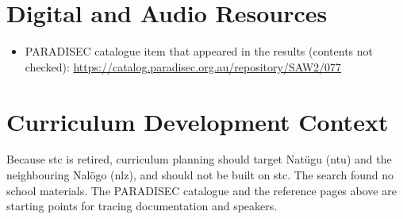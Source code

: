 \documentclass[12pt]{article}
\begin{document}
\section{Digital and Audio Resources}
\begin{itemize}
\item PARADISEC catalogue item that appeared in the results (contents not checked): \url{https://catalog.paradisec.org.au/repository/SAW2/077}
\end{itemize}

\section{Curriculum Development Context}
Because stc is retired, curriculum planning should target Natügu (ntu) and the neighbouring Nal\"ogo (nlz), and should not be built on stc. The search found no school materials. The PARADISEC catalogue and the reference pages above are starting points for tracing documentation and speakers.
\end{document}
